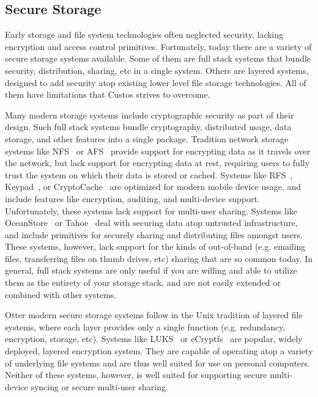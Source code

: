 \subsection{Secure Storage}

Early storage and file system technologies often neglected security,
lacking encryption and access control primitives. Fortunately, today
there are a variety of secure storage systems available. Some of them
are full stack systems that bundle security, distribution, sharing,
etc in a single system. Others are layered systems, designed to add
security atop existing lower level file storage technologies. All of
them have limitations that Custos strives to overcome.

Many modern storage systems include cryptographic security as part of
their design. Such full stack systems bundle cryptography, distributed
usage, data storage, and other features into a single
package. Tradition network storage systems like
NFS~\cite{Sandberg1985} or AFS~\cite{Howard1988} provide support for
encrypting data as it travels over the network, but lack support for
encrypting data at rest, requiring users to fully trust the system on
which their data is stored or cached. Systems like
RFS~\cite{Dong2011}, Keypad~\cite{Geambasu2011}, or
CryptoCache~\cite{Jensen2000} are optimized for modern mobile device
usage, and include features like encryption, auditing, and
multi-device support. Unfortunately, these systems lack support for
multi-user sharing. Systems like OceanStore~\cite{Kubiatowicz2000} or
Tahoe~\cite{Wilcox-O'Hearn2008} deal with securing data atop untrusted
infrastructure, and include primitives for securely sharing and
distributing files amongst users. These systems, however, lack support
for the kinds of out-of-band (e.g. emailing files, transferring files
on thumb drives, etc) sharing that are so common today. In general,
full stack systems are only useful if you are willing and able to
utilize them as the entirety of your storage stack, and are not easily
extended or combined with other systems.

Otter modern secure storage systems follow in the Unix tradition of
layered file systems, where each layer provides only a single function
(e.g. redundancy, encryption, storage, etc). Systems like
LUKS~\cite{luks} or eCryptfs~\cite{eCryptfs} are popular, widely
deployed, layered encryption system. They are capable of operating
atop a variety of underlying file systems and are thus well suited for
use on personal computers. Neither of these systems, however, is well
suited for supporting secure multi-device syncing or secure multi-user
sharing.


